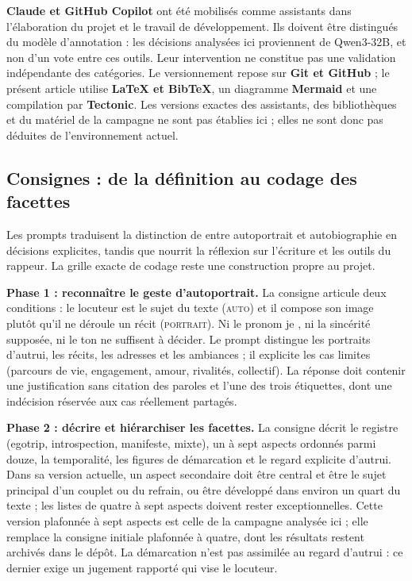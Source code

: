 \documentclass[a4paper,11pt]{article}
\begin{document}
\textbf{Claude et GitHub Copilot} ont été mobilisés comme assistants dans
l'élaboration du projet et le travail de développement. Ils doivent être
distingués du modèle d'annotation : les décisions analysées ici proviennent
de Qwen3-32B, et non d'un vote entre ces outils. Leur intervention ne constitue
pas une validation indépendante des catégories. Le versionnement repose sur
\textbf{Git et GitHub} ; le présent article utilise \textbf{LaTeX et BibTeX},
un diagramme \textbf{Mermaid} et une compilation par \textbf{Tectonic}.
Les versions exactes des assistants, des bibliothèques et du matériel de la
campagne ne sont pas établies ici ; elles ne sont donc pas déduites de
l'environnement actuel.

\subsection{Consignes : de la définition au codage des facettes}
Les prompts traduisent la distinction de \citet{beaujour1980} entre
autoportrait et autobiographie en décisions explicites, tandis que
\citet{bethune2011} nourrit la réflexion sur l'écriture et les outils du
rappeur. La grille exacte de codage reste une construction propre au projet.

\textbf{Phase 1 : reconnaître le geste d'autoportrait.}
La consigne articule deux conditions : le locuteur est le sujet du texte
(\textsc{auto}) et il compose son image plutôt qu'il ne déroule un récit
(\textsc{portrait}). Ni le pronom \og je \fg{}, ni la sincérité supposée,
ni le ton ne suffisent à décider. Le prompt distingue les portraits d'autrui,
les récits, les adresses et les ambiances ; il explicite les cas limites
(parcours de vie, engagement, amour, rivalités, collectif). La réponse doit
contenir une justification sans citation des paroles et l'une des trois
étiquettes, dont une indécision réservée aux cas réellement partagés.

\textbf{Phase 2 : décrire et hiérarchiser les facettes.}
La consigne décrit le registre (egotrip, introspection, manifeste, mixte),
un à sept aspects ordonnés parmi douze, la temporalité, les figures de
démarcation et le regard explicite d'autrui. Dans sa version actuelle,
un aspect secondaire doit être central et être le sujet principal d'un
couplet ou du refrain, ou être développé dans environ un quart du texte ;
les listes de quatre à sept aspects doivent rester exceptionnelles.
Cette version plafonnée à sept aspects est celle de la campagne analysée
ici ; elle remplace la consigne initiale plafonnée à quatre, dont les
résultats restent archivés dans le dépôt.
La démarcation n'est pas assimilée au regard d'autrui : ce dernier exige
un jugement rapporté qui vise le locuteur.
\end{document}
